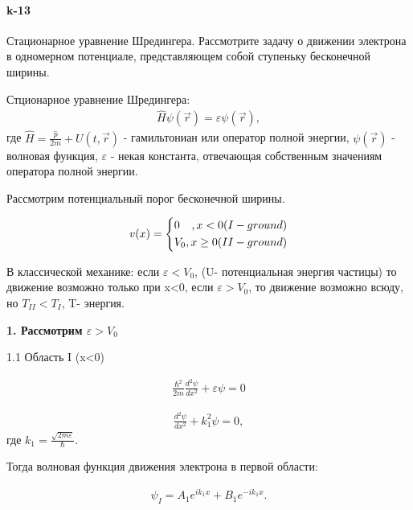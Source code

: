 


\paragraph{k-13}
Стационарное уравнение Шредингера. Рассмотрите задачу о движении электрона в одномерном потенциале, представляющем собой ступеньку бесконечной ширины.

\begin{definition}
	Стционарное уравнение Шредингера: 
	\begin{gather}
	\label{shred}
	\hat{H}\psi(\vec{r})=\varepsilon\psi(\vec{r}), 
	\end{gather}
	где $\hat{H}=\frac{\hat{p}}{2m}+U(t,\vec{r})$ - гамильтониан или оператор полной энергии, $\psi(\vec{r})$ - волновая функция, $\varepsilon$ - некая константа,  отвечающая собственным значениям оператора полной энергии.
\end{definition}

Рассмотрим потенциальный порог бесконечной ширины.


$$
v(x)=
\left\{
\begin{gathered}
0\hfill ,x<0 (I - ground)\\
V_{0}\hfill, x\ge 0 (II - ground)\\
\end{gathered}
\right.
$$

В классической механике: если $\varepsilon<V_{0}$, (U- потенциальная энергия частицы) то движение возможно только при x<0, если $\varepsilon>V_{0}$, то движение возможно всюду, но $T_{II}<T_{I}$, T- энергия.

\textbf{1. Рассмотрим  $\varepsilon>V_{0}$ }

1.1 Область I (x<0)

\begin{gather}
\label{movi1}
\frac{\hbar^{2}}{2m}\frac{d^{2}\psi}{dx^{2}}+\varepsilon\psi=0
\end{gather}

\begin{gather}
\label{movi2}
\frac{d^{2}\psi}{dx^{2}}+k_{1}^{2}\psi=0,
\end{gather}
где $k_{1}=\frac{\sqrt{2m\varepsilon}}{\hbar}$.

Тогда волновая функция движения электрона в первой области:

\begin{gather}
\label{movi3}
\psi_{I}=A_{1}e^{ik_{1}x}+B_{1}e^{-ik_{1}x}.
\end{gather}


